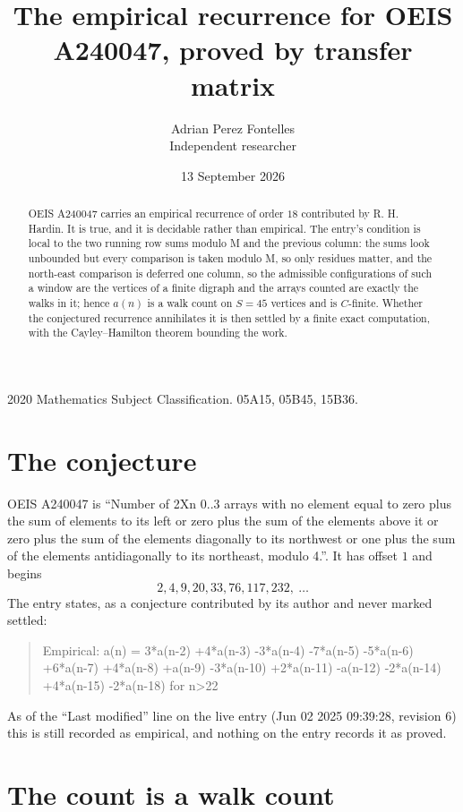 \documentclass[11pt,a4paper]{article}
\title{The empirical recurrence for OEIS A240047, proved by transfer matrix}
\author{Adrian Perez Fontelles\\ \small Independent researcher}
\date{13 September 2026}
\theoremstyle{plain}
\theoremstyle{definition}
\begin{document}
\maketitle

\begin{abstract}
OEIS A240047 carries an empirical recurrence of order $18$ contributed by R. H. Hardin. It is
true, and it is decidable rather than empirical. The entry's condition is local to the two running row sums modulo M and the previous column: the sums look unbounded but every comparison is taken modulo M, so only residues matter, and the north-east comparison is deferred one column, so
the admissible configurations of such a window are the vertices of a finite digraph and the
arrays counted are exactly the walks in it; hence $a(n)$ is a walk count on $S=45$ vertices
and is $C$-finite. Whether the conjectured recurrence annihilates it is then settled by a
finite exact computation, with the Cayley--Hamilton theorem bounding the work.
\end{abstract}

\noindent\small 2020 Mathematics Subject Classification. 05A15, 05B45, 15B36.\normalsize

\section{The conjecture}

OEIS A240047 is ``Number of 2Xn 0..3 arrays with no element equal to zero plus the sum of elements to its left or zero plus the sum of the elements above it or zero plus the sum of the elements diagonally to its northwest or one plus the sum of the elements antidiagonally to its northeast, modulo 4.''. It has offset $1$ and begins
\[
2, 4, 9, 20, 33, 76, 117, 232,\ \dots
\]
The entry states, as a conjecture contributed by its author and never marked settled:
\begin{quote}
Empirical: a(n) = 3*a(n-2) +4*a(n-3) -3*a(n-4) -7*a(n-5) -5*a(n-6) +6*a(n-7) +4*a(n-8) +a(n-9) -3*a(n-10) +2*a(n-11) -a(n-12) -2*a(n-14) +4*a(n-15) -2*a(n-18) for n>22
\end{quote}
As of the ``Last modified'' line on the live entry (Jun 02 2025 09:39:28, revision 6) this is still
recorded as empirical, and nothing on the entry records it as proved.

\section{The count is a walk count}
\end{document}
